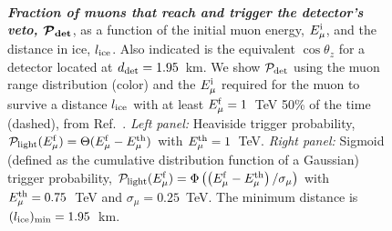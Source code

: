 \documentclass[aps,prd,showpacs,letterpaper,onecolumn,longbibliography,superscriptaddress,notitlepage,nofootinbib]{revtex4-1}%
\newcommand{\Emf}{E_{\mu}^{\rm f}}
\newcommand{\Emi}{E_{\mu}^{\rm i}}
\newcommand{\Prob}{{\cal P}}
\begin{document}
\begin{figure}
\centering
    \\[0.3ex]
\caption{\textbf{\textit{Fraction of muons that reach and trigger the detector's veto, $\boldsymbol{\Prob_{\rm det}}$}}, as a function of the initial muon energy, $\Emi$, and the distance in ice, $l_{\rm ice}$. Also indicated is the equivalent $\cos \theta_z$ for a detector located at $d_{\rm det} = 1.95$~km. We show $\Prob_{\rm det}$ using the muon range distribution (color) and the $\Emi$ required for the muon to survive a distance $l_{\rm ice}$ with at least $\Emf = 1$~TeV 50\% of the time (dashed), from Ref.~\cite{Gaisser:2014bja}. \textit{Left panel:} Heaviside trigger probability, $\Prob_{\rm light}(\Emf) = \Theta(\Emf - E_{\mu}^{\rm th})$ with $E_{\mu}^{\rm th} = 1$~TeV. \textit{Right panel:} Sigmoid (defined as the cumulative distribution function of a Gaussian) trigger probability, $\Prob_{\rm light}(\Emf) = \Phi\left(\left(\Emf - E_{\mu}^{\rm th}\right)/\sigma_\mu\right)$ with $E_{\mu}^{\rm th} = 0.75$~TeV and $\sigma_\mu = 0.25$~TeV. The minimum distance is $(l_{\rm ice})_{\rm min} = 1.95$~km.}
\label{fig:pdet}
\end{figure}
\end{document}
